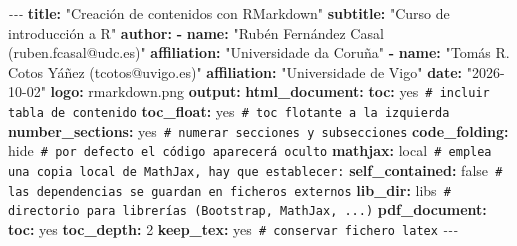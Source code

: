 \documentclass[
]{book}
\newenvironment{Shaded}{\begin{snugshade}}{\end{snugshade}}
\newcommand{\AttributeTok}[1]{\textcolor[rgb]{0.13,0.29,0.53}{#1}}
\newcommand{\CharTok}[1]{\textcolor[rgb]{0.31,0.60,0.02}{#1}}
\newcommand{\CommentTok}[1]{\textcolor[rgb]{0.56,0.35,0.01}{\textit{#1}}}
\newcommand{\DecValTok}[1]{\textcolor[rgb]{0.00,0.00,0.81}{#1}}
\newcommand{\FunctionTok}[1]{\textcolor[rgb]{0.13,0.29,0.53}{\textbf{#1}}}
\newcommand{\KeywordTok}[1]{\textcolor[rgb]{0.13,0.29,0.53}{\textbf{#1}}}
\newcommand{\PreprocessorTok}[1]{\textcolor[rgb]{0.56,0.35,0.01}{\textit{#1}}}
\newcommand{\StringTok}[1]{\textcolor[rgb]{0.31,0.60,0.02}{#1}}
\theoremstyle{break}
\theoremstyle{nonumberplain}
\renewcommand{\CommentTok}[1]{\textcolor[rgb]{0.41,0.41,0.41}{\texttt{#1}}}
\begin{document}
\begin{Shaded}
\begin{Highlighting}[]
\PreprocessorTok{{-}{-}{-}}
\FunctionTok{title}\KeywordTok{:}\AttributeTok{ }\StringTok{"Creación de contenidos con RMarkdown"}
\FunctionTok{subtitle}\KeywordTok{:}\AttributeTok{ }\StringTok{"Curso de introducción a R"}
\FunctionTok{author}\KeywordTok{:}
\KeywordTok{{-}}\AttributeTok{ }\FunctionTok{name}\KeywordTok{:}\AttributeTok{ }\StringTok{"Rubén Fernández Casal (ruben.fcasal@udc.es)"}
\AttributeTok{  }\FunctionTok{affiliation}\KeywordTok{:}\AttributeTok{ }\StringTok{"Universidade da Coruña"}
\KeywordTok{{-}}\AttributeTok{ }\FunctionTok{name}\KeywordTok{:}\AttributeTok{ }\StringTok{"Tomás R. Cotos Yáñez (tcotos@uvigo.es)"}
\AttributeTok{  }\FunctionTok{affiliation}\KeywordTok{:}\AttributeTok{ }\StringTok{"Universidade de Vigo"}
\FunctionTok{date}\KeywordTok{:}\AttributeTok{ }\StringTok{"2026{-}10{-}02"}
\FunctionTok{logo}\KeywordTok{:}\AttributeTok{ rmarkdown.png}
\FunctionTok{output}\KeywordTok{:}
\AttributeTok{  }\FunctionTok{html\_document}\KeywordTok{:}
\AttributeTok{    }\FunctionTok{toc}\KeywordTok{:}\AttributeTok{ }\CharTok{yes}\CommentTok{                  \# incluir tabla de contenido}
\AttributeTok{    }\FunctionTok{toc\_float}\KeywordTok{:}\AttributeTok{ }\CharTok{yes}\CommentTok{            \# toc flotante a la izquierda}
\AttributeTok{    }\FunctionTok{number\_sections}\KeywordTok{:}\AttributeTok{ }\CharTok{yes}\CommentTok{      \# numerar secciones y subsecciones}
\AttributeTok{    }\FunctionTok{code\_folding}\KeywordTok{:}\AttributeTok{ hide}\CommentTok{        \# por defecto el código aparecerá oculto}
\AttributeTok{    }\FunctionTok{mathjax}\KeywordTok{:}\AttributeTok{ local}\CommentTok{            \# emplea una copia local de MathJax, hay que establecer:}
\AttributeTok{    }\FunctionTok{self\_contained}\KeywordTok{:}\AttributeTok{ }\CharTok{false}\CommentTok{     \# las dependencias se guardan en ficheros externos}
\AttributeTok{    }\FunctionTok{lib\_dir}\KeywordTok{:}\AttributeTok{ libs}\CommentTok{             \# directorio para librerías (Bootstrap, MathJax, ...)}
\AttributeTok{  }\FunctionTok{pdf\_document}\KeywordTok{:}
\AttributeTok{    }\FunctionTok{toc}\KeywordTok{:}\AttributeTok{ }\CharTok{yes}
\AttributeTok{    }\FunctionTok{toc\_depth}\KeywordTok{:}\AttributeTok{ }\DecValTok{2}
\AttributeTok{    }\FunctionTok{keep\_tex}\KeywordTok{:}\AttributeTok{ }\CharTok{yes}\CommentTok{             \# conservar fichero latex}
\PreprocessorTok{{-}{-}{-}}
\end{Highlighting}
\end{Shaded}
\end{document}
